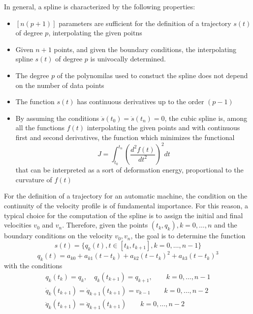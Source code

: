 \documentclass{book}
\begin{document}
In general, a spline is characterized by the following properties: 
\begin{itemize}
  \item $[n(p+1)]$ parameters are sufficient for the definition of a trajectory $s(t)$ of degree $p$, interpolating the given poitns 
  \item Given $n+1$ points, and given the boundary conditions, the interpolating spline $s(t)$ of degree $p$ is univocally determined. 
  \item The degree $p$ of the polynomilas used to constuct the spline does not depend on the number of data points 
  \item The function $s(t)$ has continuous derivatives up to the order $(p-1)$
  \item By assuming the conditions $\ddot{s}(t_0)=\ddot{s}(t_n)=0$, the cubic spline is, among all the functions $f(t)$ interpolating the given points and with continuous first and second derivatives, the function which minimizes the functional 
    \[
      J=\displaystyle\int_{t_0}^{t_n}\left(\displaystyle\frac{d^2f(t)}{dt^2}\right)^2 dt
    \]
    that can be interpreted as a sort of deformation energy, proportional to the curvature of $f(t)$
\end{itemize}

For the definition of a trajectory for an automatic machine, the condition on the continuity of the velocity profile is of fundamental importance. For this reason, a typical choice for the computation of the spline is to assign the initial and final velocities $v_0$ and $v_n$. Therefore, given the points $(t_k,q_k),k=0,\dots,n$ and the boundary conditions on the velocity $v_0,v_n$, the goal is to determine the function 
\[
  s(t) = \{q_k(t), t\in[t_k,t_{k+1}],k=0,\dots,n-1\}
\]
\[
  q_k(t)=a_{k0}+a_{k1}(t-t_k)+a_{k2}(t-t_k)^2+a_{k3}(t-t_k)^3
\]
with the conditions 
\begin{gather*}
  q_k(t_k)=q_k,\quad q_k(t_{k+1})=q_{k+1}, \qquad k=0,\dots,n-1\\
  \dot{q}_k(t_{k+1})=\dot{q}_{k+1}(t_{k+1})=v_{k-1} \qquad k=0,\dots,n-2\\
  \ddot{q}_k(t_{k+1})=\ddot{q}_{k+1}(t_{k+1}) \qquad k=0,\dots,n-2
\end{gather*}
\end{document}
